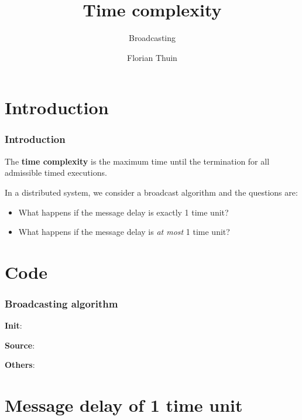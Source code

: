 \documentclass{beamer}
\title{Time complexity}
\subtitle{Broadcasting}
\author{Florian Thuin}
\institute{Ecole Polytechnique de Louvain}
\begin{document}
\begin{frame}[plain]
	\titlepage{}
\end{frame}



\section{Introduction}

\begin{frame}
    \frametitle{Introduction}

    The \textbf{time complexity} is the maximum time until the termination for
    all admissible timed executions. \newline

    In a distributed system, we consider a broadcast algorithm and the questions
    are:

    \begin{itemize}
        \item What happens if the message delay is exactly 1 time unit?
        \item What happens if the message delay is \textit{at most} 1 time unit?
    \end{itemize}
\end{frame}

\section{Code}

\begin{frame}
	\frametitle{Broadcasting algorithm}
    \textbf{Init}:
    
    \textbf{Source}:
    
    \textbf{Others}:
    
\end{frame}

\section{Message delay of 1 time unit}
\end{document}

